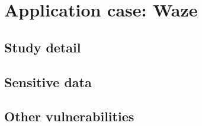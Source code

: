 \section{Application case: Waze}
	\subsection{Study detail}
	\subsection{Sensitive data}
	\subsection{Other vulnerabilities}
